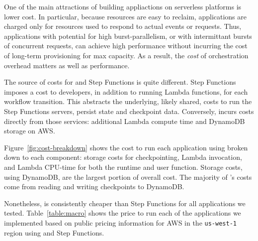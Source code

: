 One of the main attractions of building appliactions on serverless platforms
is lower cost. In particular, because resources are easy to reclaim,
applications are charged only for resources used to respond to actual events
or requests. Thus, applications with potential for high burst-parallelism, or
with intermittant bursts of concurrent requests, can achieve high performance
without incurring the cost of long-term provisioning for max capacity. As a
result, the \emph{cost} of orchestration overhead matters as well as
performance.

The source of costs for \name{} and Step Functions is quite different. Step
Functions imposes a cost to developers, in addition to running Lambda
functions, for each workflow transition. This abstracts the underlying, likely
shared, costs to run the Step Functions servers, persist state and checkpoint
data. Conversely, \name{} incurs costs directly from those services:
additional Lambda compute time and DynamoDB storage on AWS.

Figure~\ref{fig:cost-breakdown} shows the cost to run each application using
\name{} broken down to each component: storage costs for checkpointing, Lambda
invocation, and Lambda CPU-time for both the \name{} runtime and user function.
Storage costs, using DynamoDB, are the largest portion of overall cost. The
majority of \name{}'s costs come from reading and writing checkpoints to
DynamoDB.

Nonetheless, \name{} is consistently cheaper than Step Functions for all
applications we tested. Table~\ref{table:macro} shows the price to run each of
the applications we implemented based on public pricing information for AWS in
the \texttt{us-west-1} region using \name{} and Step Functions.


%
%

